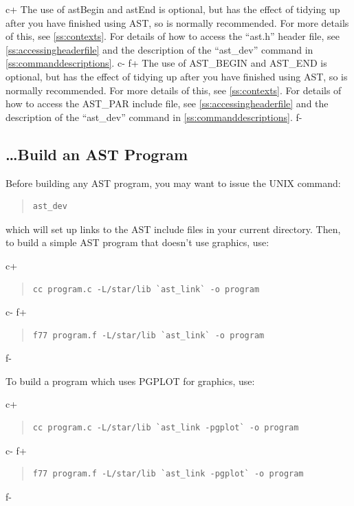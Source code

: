 \documentclass[twoside,11pt]{article}
\newcommand{\appref}[1]{Appendix~\ref{#1}}
\newcommand{\secref}[1]{\S\ref{#1}}
\renewcommand{\appref}[1]{\ref{#1}}
\renewcommand{\secref}[1]{\ref{#1}}
\begin{document}
c+
The use of astBegin and astEnd is optional, but has the effect of
tidying up after you have finished using AST, so is normally
recommended. For more details of this, see \secref{ss:contexts}. For
details of how to access the ``ast.h'' header file, see
\secref{ss:accessingheaderfile} and the description of the
``ast\_dev'' command in \appref{ss:commanddescriptions}.
c-
f+
The use of AST\_BEGIN and AST\_END is optional, but has the effect of
tidying up after you have finished using AST, so is normally
recommended. For more details of this, see \secref{ss:contexts}. For
details of how to access the AST\_PAR include file, see
\secref{ss:accessingheaderfile} and the description of the
``ast\_dev'' command in \appref{ss:commanddescriptions}.
f-

\subsection{\label{ss:howtobuild}\ldots Build an AST Program}

Before building any AST program, you may want to issue the UNIX command:

\begin{quote}
\small
\begin{verbatim}
ast_dev
\end{verbatim}
\normalsize
\end{quote}

which will set up links to the AST include files in your current
directory.  Then, to build a simple AST program that doesn't use
graphics, use:

c+
\begin{quote}
\small
\begin{verbatim}
cc program.c -L/star/lib `ast_link` -o program
\end{verbatim}
\normalsize
\end{quote}
c-
f+
\begin{quote}
\small
\begin{verbatim}
f77 program.f -L/star/lib `ast_link` -o program
\end{verbatim}
\normalsize
\end{quote}
f-

To build a program which uses PGPLOT for graphics, use:

c+
\begin{quote}
\small
\begin{verbatim}
cc program.c -L/star/lib `ast_link -pgplot` -o program
\end{verbatim}
\normalsize
\end{quote}
c-
f+
\begin{quote}
\small
\begin{verbatim}
f77 program.f -L/star/lib `ast_link -pgplot` -o program
\end{verbatim}
\normalsize
\end{quote}
f-
\end{document}
